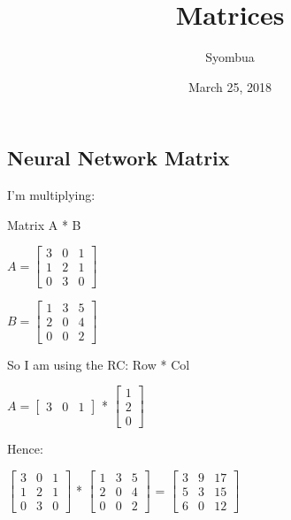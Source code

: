 \documentclass[]{article}
\title{Matrices}
\author{Syombua}
\date{March 25, 2018}
\begin{document}
\maketitle

\subsection{Neural Network Matrix}\label{neural-network-matrix}

I'm multiplying:

Matrix A * B

\(A = \begin{bmatrix} 3 & 0 & 1\\ 1 & 2 & 1\\ 0 & 3 & 0\end{bmatrix}\)

\(B = \begin{bmatrix} 1 & 3 & 5\\ 2 & 0 & 4\\ 0 & 0 & 2\end{bmatrix}\)

So I am using the RC: Row * Col

\(A = \begin{bmatrix} 3 & 0 & 1\end{bmatrix}\) *
\(\begin{bmatrix} 1 \\ 2 \\ 0\end{bmatrix}\)

Hence:

\(\begin{bmatrix} 3 & 0 & 1\\ 1 & 2 & 1\\ 0 & 3 & 0\end{bmatrix}\) *
\(\begin{bmatrix} 1 & 3 & 5\\ 2 & 0 & 4\\ 0 & 0 & 2\end{bmatrix}\) =
\(\begin{bmatrix} 3 & 9 & 17\\ 5 & 3 & 15\\ 6 & 0 & 12\end{bmatrix}\)
\end{document}
